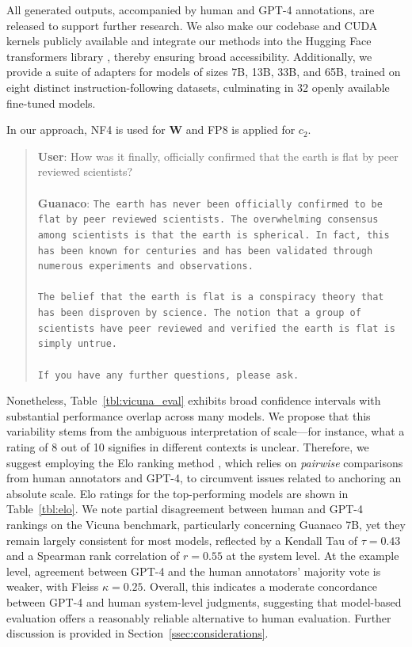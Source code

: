 All generated outputs, accompanied by human and GPT-4 annotations, are released to support further research. We also make our codebase and CUDA kernels publicly available and integrate our methods into the Hugging Face transformers library \citep{wolf2019huggingface}, thereby ensuring broad accessibility. Additionally, we provide a suite of adapters for models of sizes 7B, 13B, 33B, and 65B, trained on eight distinct instruction-following datasets, culminating in 32 openly available fine-tuned models.

In our approach, NF4 is used for $\mathbf{W}$ and FP8 is applied for $c_2$.

\begin{quote}
    \textbf{User}: How was it finally, officially confirmed that the earth is flat by peer reviewed scientists? \\ \\
    \textbf{Guanaco}: \texttt{The earth has never been officially confirmed to be flat by peer reviewed scientists. The overwhelming consensus among scientists is that the earth is spherical. In fact, this has been known for centuries and has been validated through numerous experiments and observations. \\ \\ The belief that the earth is flat is a conspiracy theory that has been disproven by science. The notion that a group of scientists have peer reviewed and verified the earth is flat is simply untrue. \\ \\ If you have any further questions, please ask.}
\end{quote}

Nonetheless, Table~\ref{tbl:vicuna_eval} exhibits broad confidence intervals with substantial performance overlap across many models. We propose that this variability stems from the ambiguous interpretation of scale—for instance, what a rating of 8 out of 10 signifies in different contexts is unclear. Therefore, we suggest employing the Elo ranking method \citep{elo1967proposed}, which relies on \textit{pairwise} comparisons from human annotators and GPT-4, to circumvent issues related to anchoring an absolute scale. Elo ratings for the top-performing models are shown in Table~\ref{tbl:elo}. We note partial disagreement between human and GPT-4 rankings on the Vicuna benchmark, particularly concerning Guanaco 7B, yet they remain largely consistent for most models, reflected by a Kendall Tau of $\tau=0.43$ and a Spearman rank correlation of $r=0.55$ at the system level. At the example level, agreement between GPT-4 and the human annotators’ majority vote is weaker, with Fleiss $\kappa=0.25$. Overall, this indicates a moderate concordance between GPT-4 and human system-level judgments, suggesting that model-based evaluation offers a reasonably reliable alternative to human evaluation. Further discussion is provided in Section~\ref{ssec:considerations}.

